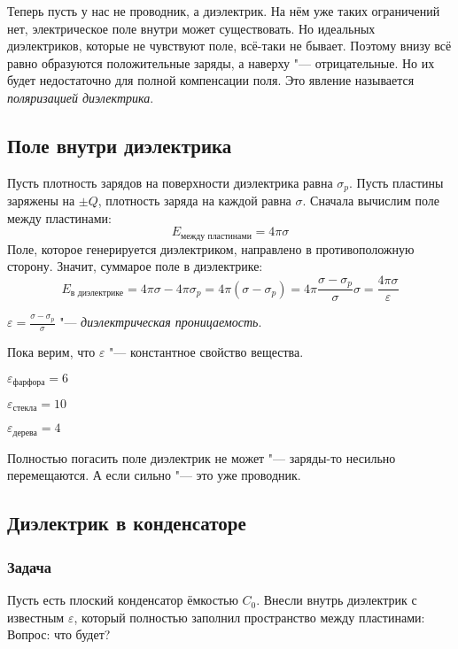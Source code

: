     Теперь пусть у нас не проводник, а диэлектрик.
    На нём уже таких ограничений нет, электрическое поле внутри может существовать.
    Но идеальных диэлектриков, которые не чувствуют поле, всё-таки не бывает.
    Поэтому внизу всё равно образуются положительные заряды, а наверху "--- отрицательные.
    Но их будет недостаточно для полной компенсации поля.
    Это явление называется \textit{поляризацией диэлектрика}.

  \subsection{Поле внутри диэлектрика}
    Пусть плотность зарядов на поверхности диэлектрика равна $\sigma_p$.
    Пусть пластины заряжены на $\pm Q$, плотность заряда на каждой равна $\sigma$.
    Сначала вычислим поле между пластинами:
    \[E_{\text{между пластинами}} = 4\pi \sigma\]
    Поле, которое генерируется диэлектриком, направлено в противоположную сторону.
    Значит, суммарое поле в диэлектрике:
    \[ E_\text{в диэлектрике}
        = 4\pi\sigma - 4\pi\sigma_p
        = 4\pi(\sigma - \sigma_p)
        = 4\pi\frac{\sigma - \sigma_p}{\sigma}\sigma
        = \frac{4\pi\sigma}{\varepsilon}
    \]
    \begin{Def}
      $\varepsilon = \frac{\sigma - \sigma_p}{\sigma}$ "--- \textit{диэлектрическая проницаемость}.
    \end{Def}
    \begin{Rem}
      Пока верим, что $\varepsilon$ "--- константное свойство вещества.
    \end{Rem}
    \begin{exmp}$\varepsilon_\text{фарфора} = 6$\end{exmp}
    \begin{exmp}$\varepsilon_\text{стекла} = 10$\end{exmp}
    \begin{exmp}$\varepsilon_\text{дерева} = 4$\end{exmp}
    \begin{Rem}
      Полностью погасить поле диэлектрик не может "--- заряды-то несильно перемещаются.
      А если сильно "--- это уже проводник.
    \end{Rem}

  \subsection{Диэлектрик в конденсаторе}
    \subsubsection{Задача}
      Пусть есть плоский конденсатор ёмкостью $C_0$.
      Внесли внутрь диэлектрик с известным $\varepsilon$, который полностью заполнил пространство между пластинами:
      Вопрос: что будет?

